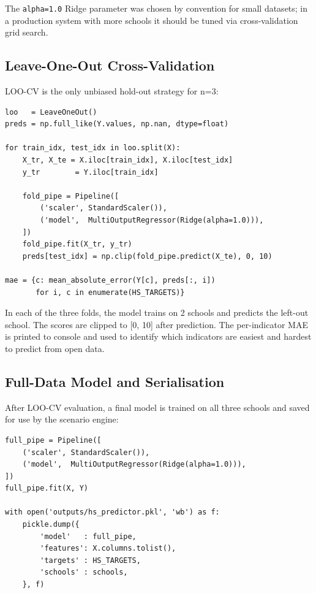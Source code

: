\documentclass[11pt,a4paper,openany]{book}
\begin{document}
The \texttt{alpha=1.0} Ridge parameter was chosen by convention for small datasets; in a production system with more schools it should be tuned via cross-validation grid search.

\subsection{Leave-One-Out Cross-Validation}

LOO-CV is the only unbiased hold-out strategy for n=3:

\begin{lstlisting}[style=python, caption={LOO-CV loop in ml\_model.py.}]
loo   = LeaveOneOut()
preds = np.full_like(Y.values, np.nan, dtype=float)

for train_idx, test_idx in loo.split(X):
    X_tr, X_te = X.iloc[train_idx], X.iloc[test_idx]
    y_tr        = Y.iloc[train_idx]

    fold_pipe = Pipeline([
        ('scaler', StandardScaler()),
        ('model',  MultiOutputRegressor(Ridge(alpha=1.0))),
    ])
    fold_pipe.fit(X_tr, y_tr)
    preds[test_idx] = np.clip(fold_pipe.predict(X_te), 0, 10)

mae = {c: mean_absolute_error(Y[c], preds[:, i])
       for i, c in enumerate(HS_TARGETS)}
\end{lstlisting}

In each of the three folds, the model trains on 2 schools and predicts the left-out school. The scores are clipped to [0, 10] after prediction. The per-indicator MAE is printed to console and used to identify which indicators are easiest and hardest to predict from open data.

\subsection{Full-Data Model and Serialisation}

After LOO-CV evaluation, a final model is trained on all three schools and saved for use by the scenario engine:

\begin{lstlisting}[style=python, caption={Full-data training and pickle serialisation.}]
full_pipe = Pipeline([
    ('scaler', StandardScaler()),
    ('model',  MultiOutputRegressor(Ridge(alpha=1.0))),
])
full_pipe.fit(X, Y)

with open('outputs/hs_predictor.pkl', 'wb') as f:
    pickle.dump({
        'model'   : full_pipe,
        'features': X.columns.tolist(),
        'targets' : HS_TARGETS,
        'schools' : schools,
    }, f)
\end{lstlisting}
\end{document}
